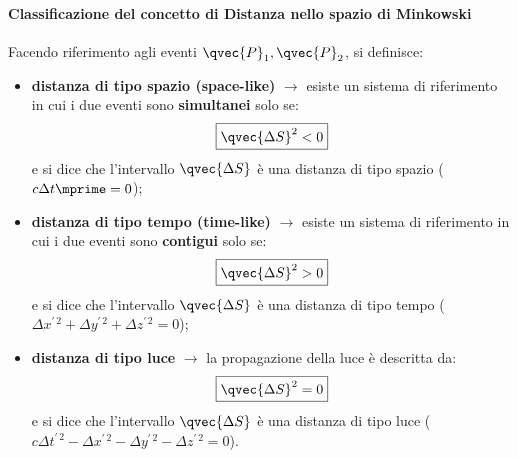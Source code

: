 \paragraph{Classificazione del concetto di Distanza nello spazio di Minkowski}
Facendo riferimento agli eventi $\qvec{P}_1, \qvec{P}_2$, si definisce:
\begin{itemize}
  \item \textbf{distanza di tipo spazio (space-like)} $\rightarrow$ esiste un
    sistema di riferimento in cui i due eventi sono \textbf{simultanei} solo
    se:
    \begin{equation}
      \boxed{\qvec{\Delta S}^2 < 0}
    \end{equation}
    e si dice che l'intervallo $\qvec{\Delta S}$ è una distanza di tipo spazio
    ($c \Delta t \mprime = 0$);
  \item \textbf{distanza di tipo tempo (time-like)} $\rightarrow$ esiste un
    sistema di riferimento in cui i due eventi sono \textbf{contigui} solo se:
    \begin{equation}
      \boxed{\qvec{\Delta S}^2 > 0}
    \end{equation}
    e si dice che l'intervallo $\qvec{\Delta S}$ è una distanza di tipo tempo
    ($\Delta x ^{\prime\, 2} + \Delta y ^{\prime\, 2} + \Delta z ^{\prime\, 2}
    = 0$);
  \item \textbf{distanza di tipo luce} $\rightarrow$ la propagazione della luce
    è descritta da:
    \begin{equation}
      \boxed{\qvec{\Delta S}^2 = 0}
    \end{equation}
    e si dice che l'intervallo $\qvec{\Delta S}$ è una distanza di tipo luce
    ($c \Delta t ^{\prime\, 2} - \Delta x ^{\prime\, 2} - \Delta y ^{\prime\, 2}
    - \Delta z ^{\prime\, 2} = 0$).
\end{itemize}

